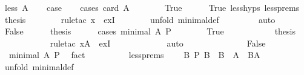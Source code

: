 \begin{isabellebody}
\isamarkupfalse%
\ {\isacharparenleft}less\ A{\isacharparenright}\isanewline
\ \ \isamarkupfalse%
\ {\isacharquery}case\isanewline
\ \ \isamarkupfalse%
\ {\isacharparenleft}cases\ {\isachardoublequoteopen}card\ A\ {\isacharequal}\ {}{\isachardoublequoteclose}{\isacharparenright}\ \ \isanewline
\ \ \isamarkupfalse%
\ True\isanewline
\ \ \ \ \isamarkupfalse%
\ True\ less{\isachardot}hyps\ less{\isachardot}prems\ \isamarkupfalse%
\ {\isacharquery}thesis\isanewline
\ \ \ \ \ \ \isamarkupfalse%
\ {\isacharparenleft}rule{\isacharunderscore}tac\ x{\isacharequal}{\isachardoublequoteopen}{\isacharbraceleft}{\isacharbraceright}{\isachardoublequoteclose}\ \ exI{\isacharparenright}\isanewline
\ \ \ \ \ \ \isamarkupfalse%
\ {\isacharparenleft}unfold\ minimal{\isacharunderscore}def{\isacharparenright}\isanewline
\ \ \ \ \ \ \isamarkupfalse%
\ \ auto\isanewline
\ \ \isamarkupfalse%
\isanewline
\ \ \isamarkupfalse%
\ False\isanewline
\ \ \ \ \isamarkupfalse%
\ {\isacharquery}thesis\isanewline
\ \ \ \ \isamarkupfalse%
\ {\isacharparenleft}cases\ {\isachardoublequoteopen}minimal\ A\ P{\isachardoublequoteclose}{\isacharparenright}\isanewline
\ \ \ \ \ \ \isamarkupfalse%
\ True\isanewline
\ \ \ \ \ \ \ \ \isamarkupfalse%
\ \isamarkupfalse%
\ {\isacharquery}thesis\ \isanewline
\ \ \ \ \ \ \ \ \ \ \isamarkupfalse%
\ {\isacharparenleft}rule{\isacharunderscore}tac\ x{\isacharequal}{\isachardoublequoteopen}A{\isachardoublequoteclose}\ \ exI{\isacharparenright}\ \isanewline
\ \ \ \ \ \ \ \ \ \ \isamarkupfalse%
\ auto\isanewline
\ \ \ \ \ \ \isamarkupfalse%
\isanewline
\ \ \ \ \ \ \isamarkupfalse%
\ False\isanewline
\ \ \ \ \ \ \ \ \isamarkupfalse%
\ {}{\isacharcolon}\ {\isachardoublequoteopen}{\isasymnot}minimal\ A\ P{\isachardoublequoteclose}\ \isamarkupfalse%
\ fact\isanewline
\ \ \ \ \ \ \ \ \isamarkupfalse%
\ less{\isachardot}prems\ {}\ \isamarkupfalse%
\ {}{\isacharcolon}\ {\isachardoublequoteopen}{\isasymexists}B{\isachardot}\ P\ B\ {\isasymand}\ B\ {\isasymsubseteq}\ A\ {\isasymand}\ B{\isasymnoteq}A{\isachardoublequoteclose}\isanewline
\ \ \ \ \ \ \ \ \ \ \isamarkupfalse%
\ {\isacharparenleft}unfold\ minimal{\isacharunderscore}def{\isacharparenright}\ \isanewline

\end{isabellebody}
